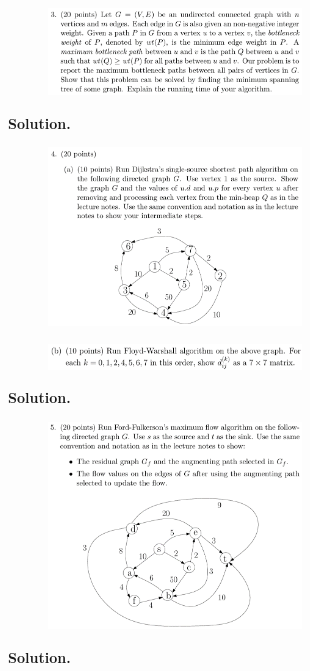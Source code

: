 \documentclass[10pt]{article}
\begin{document}
\newpage

\begin{figure}[h]
	\centering
	\includegraphics[width=0.6\textwidth]{hw4-3}
\end{figure}

\textbf{Solution.}

\newpage

\begin{figure}[h]
	\centering
	\includegraphics[width=0.6\textwidth]{hw4-4(1)}
\end{figure}
\begin{figure}[h]
	\centering
	\includegraphics[width=0.6\textwidth]{hw4-4(2)}
\end{figure}

\textbf{Solution.}

\newpage

\begin{figure}[h]
	\centering
	\includegraphics[width=0.6\textwidth]{hw4-5}
\end{figure}

\textbf{Solution.}
\end{document}
